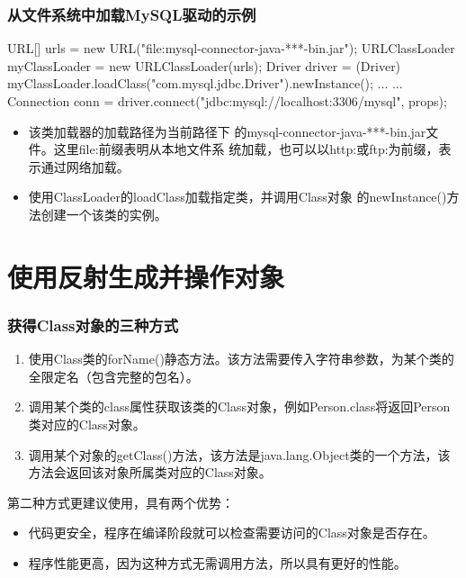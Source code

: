 \begin{frame}[fragile] %
\frametitle{从文件系统中加载MySQL驱动的示例}

\begin{javaCode}
URL[] urls = {new URL("file:mysql-connector-java-***-bin.jar")};
URLClassLoader myClassLoader = new URLClassLoader(urls);
Driver driver = (Driver) myClassLoader.loadClass("com.mysql.jdbc.Driver").newInstance();
... ...
Connection conn = driver.connect("jdbc:mysql://localhost:3306/mysql", props);
\end{javaCode}

\begin{itemize}\kai
\item 该类加载器的加载路径为当前路径下
  的mysql-connector-java-***-bin.jar文件。这里file:前缀表明从本地文件系
  统加载，也可以以http:或ftp:为前缀，表示通过网络加载。
\item 使用ClassLoader的loadClass加载指定类，并调用Class对象
  的newInstance()方法创建一个该类的实例。
\end{itemize}
\end{frame}




\section{使用反射生成并操作对象}

\begin{frame}[fragile] %
\frametitle{获得Class对象的三种方式}

\begin{enumerate}
\item 使用Class类的forName()静态方法。该方法需要传入字符串参数，为某个类的全限定名（包含完整的包名）。
\item 调用某个类的class属性获取该类的Class对象，例如Person.class将返回Person类对应的Class对象。
\item 调用某个对象的getClass()方法，该方法是java.lang.Object类的一个方法，该方法会返回该对象所属类对应的Class对象。
\end{enumerate}

第二种方式更建议使用，具有两个优势：
\begin{itemize}\kai
\item 代码更安全，程序在编译阶段就可以检查需要访问的Class对象是否存在。
\item 程序性能更高，因为这种方式无需调用方法，所以具有更好的性能。
\end{itemize}
\end{frame}

